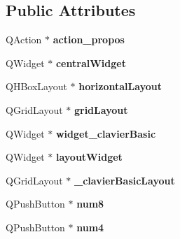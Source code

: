 \subsection*{\-Public \-Attributes}
\begin{DoxyCompactItemize}
\item 
\hypertarget{class_ui___main_window_ab5925c132a26c5f1b68712db69a43955}{\-Q\-Action $\ast$ {\bfseries action\-\_\-propos}}\label{class_ui___main_window_ab5925c132a26c5f1b68712db69a43955}

\item 
\hypertarget{class_ui___main_window_a30075506c2116c3ed4ff25e07ae75f81}{\-Q\-Widget $\ast$ {\bfseries central\-Widget}}\label{class_ui___main_window_a30075506c2116c3ed4ff25e07ae75f81}

\item 
\hypertarget{class_ui___main_window_acd6fdc9ebacc4b25b834162380d75ce8}{\-Q\-H\-Box\-Layout $\ast$ {\bfseries horizontal\-Layout}}\label{class_ui___main_window_acd6fdc9ebacc4b25b834162380d75ce8}

\item 
\hypertarget{class_ui___main_window_a525ed3c5fe0784ac502ee222fba4e205}{\-Q\-Grid\-Layout $\ast$ {\bfseries grid\-Layout}}\label{class_ui___main_window_a525ed3c5fe0784ac502ee222fba4e205}

\item 
\hypertarget{class_ui___main_window_a4684b35f7b6ce7e3b2372b2b01037ea2}{\-Q\-Widget $\ast$ {\bfseries widget\-\_\-clavier\-Basic}}\label{class_ui___main_window_a4684b35f7b6ce7e3b2372b2b01037ea2}

\item 
\hypertarget{class_ui___main_window_ab96ab0f0578098521fa69a75aa5cdde8}{\-Q\-Widget $\ast$ {\bfseries layout\-Widget}}\label{class_ui___main_window_ab96ab0f0578098521fa69a75aa5cdde8}

\item 
\hypertarget{class_ui___main_window_a7ccbf939ae6d5a0f57068259787f0f9f}{\-Q\-Grid\-Layout $\ast$ {\bfseries \-\_\-clavier\-Basic\-Layout}}\label{class_ui___main_window_a7ccbf939ae6d5a0f57068259787f0f9f}

\item 
\hypertarget{class_ui___main_window_aeca50b654eb96a8bb380a34405c0e8a6}{\-Q\-Push\-Button $\ast$ {\bfseries num8}}\label{class_ui___main_window_aeca50b654eb96a8bb380a34405c0e8a6}

\item 
\hypertarget{class_ui___main_window_acec9d7e0484591592b5b5aebe17c4d4c}{\-Q\-Push\-Button $\ast$ {\bfseries num4}}\label{class_ui___main_window_acec9d7e0484591592b5b5aebe17c4d4c}


\end{DoxyCompactItemize}

